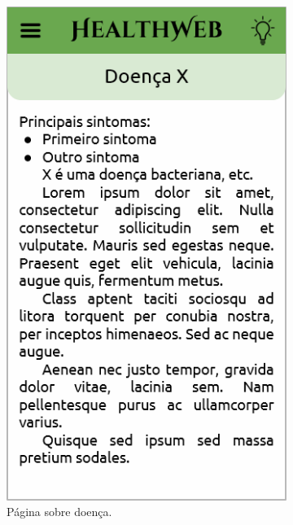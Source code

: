 \begin{figure}[htbp]
\begin{subfigure}{0.24\linewidth}
		\includegraphics[width=\linewidth]{figure/prototype/mobile/disease_page.png}
		\caption{Página sobre doença.}
		\label{fig:mobile:disease_page}
	\end{subfigure}
	\hfill
	\begin{subfigure}{0.24\linewidth}
		\centering

\end{subfigure}
\end{figure}
